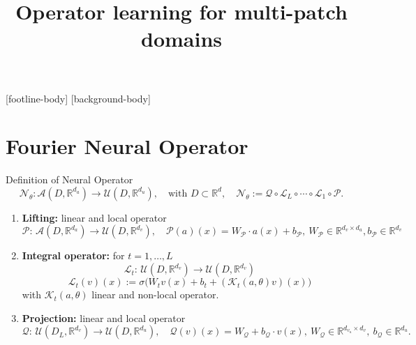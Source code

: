\documentclass{beamer}
\title{Operator learning  \newline  for multi-patch domains}
\subtitle{}
\institute{{\inst{1}Departement of Mathematics, \newline University of Pavia}}
\newcommand{\numberset}{\mathbb}
\newcommand{\R}{\numberset{R}}
\begin{document}
\frame{\titlepage}

\addtocounter{framenumber}{-1}
[footline-body]
[background-body]


\section{Fourier Neural Operator}


\begin{frame}[t]{Definition of Neural Operator}
	\vspace{-0.5cm}
	\[ \mathcal{N}_{\theta} :\mathcal{A}(D, \R^{d_a}) \to \mathcal{U}(D, \R^{d_{u}}), \quad \text{with } D \subset \R^d, \quad	\mathcal{N}_{\theta} := \mathcal{Q} \circ \mathcal{L}_L \circ \cdots \circ \mathcal{L}_1 \circ \mathcal{P} . \]
	\vspace{-0.2cm}
	\begin{enumerate}
		\item \textbf{Lifting:} linear and local operator 
		\[\mathcal{P}:\, \mathcal{A}(D, \R^{d_a}) \to \mathcal{U}(D, \R^{d_{v}}), \quad  \mathcal{P}(a)(x) = W_{\mathcal{P}}\cdot a(x) + b_{\mathcal{P}}, \ W_{\mathcal{P}} \in \R^{d_{v} \times d_a}, b_{\mathcal{P}} \in \R^{d_v}\]
	\vspace{-0.2cm}
		\pause
		\item \textbf{Integral operator:} for $ t = 1, \dots, L $
		\[ \mathcal{L}_t : \, \mathcal{U}(D, \R^{d_{v}}) \to  \mathcal{U}(D, \R^{d_{v}}) \]
		\[  \mathcal{L}_t(v)(x) := \sigma\Big( W_t v(x)+ b_t + (\mathcal{K}_t(a, \theta) v)(x) \Big) \]
		with $ \mathcal{K}_t(a, \theta) $ linear and non-local operator.  
		\pause
		\item \textbf{Projection:} linear and local operator 
		\[\mathcal{Q}:\, \mathcal{U}(D_{L}, \R^{d_{v}}) \to  \mathcal{U}(D, \R^{d_{u}}), \quad  \mathcal{Q}(v)(x) = W_{\mathcal{Q}} + b_{\mathcal{Q}}\cdot v(x), \ W_{\mathcal{Q}} \in \R^{d_{v_u} \times d_{v}}, \ b_{\mathcal{Q}}\in \R^{d_u}. \]		
	\end{enumerate}
\end{frame}

\end{document}
